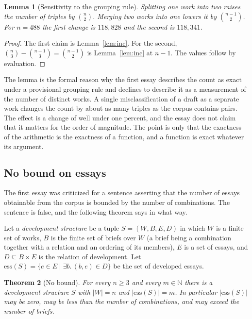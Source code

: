 \documentclass[11pt]{article}
\theoremstyle{plain}
\newtheorem{theorem}{Theorem}[section]
\newtheorem{lemma}[theorem]{Lemma}
\theoremstyle{definition}
\theoremstyle{remark}
\newcommand{\Nat}{\mathbb{N}}
\begin{document}
\begin{lemma}[Sensitivity to the grouping rule]\label{lem:group}
Splitting one work into two raises the number of triples by $\binom{n}{2}$. Merging two works into one lowers it by $\binom{n-1}{2}$. For $n=488$ the first change is $118{,}828$ and the second is $118{,}341$.
\end{lemma}

\begin{proof}
The first claim is Lemma~\ref{lem:inc}. For the second, $\binom{n}{3}-\binom{n-1}{3}=\binom{n-1}{2}$ is Lemma~\ref{lem:inc} at $n-1$. The values follow by evaluation. \qedhere
\end{proof}

The lemma is the formal reason why the first essay describes the count as exact under a provisional grouping rule and declines to describe it as a measurement of the number of distinct works. A single misclassification of a draft as a separate work changes the count by about as many triples as the corpus contains pairs. The effect is a change of well under one percent, and the essay does not claim that it matters for the order of magnitude. The point is only that the exactness of the arithmetic is the exactness of a function, and a function is exact whatever its argument.

\subsection{No bound on essays}

The first essay was criticized for a sentence asserting that the number of essays obtainable from the corpus is bounded by the number of combinations. The sentence is false, and the following theorem says in what way.

Let a \emph{development structure} be a tuple $S=(W,B,E,D)$ in which $W$ is a finite set of works, $B$ is the finite set of briefs over $W$ (a brief being a combination together with a relation and an ordering of its members), $E$ is a set of essays, and $D\subseteq B\times E$ is the relation of development. Let $\mathrm{ess}(S)=\{e\in E\mid\exists b.\,(b,e)\in D\}$ be the set of developed essays.

\begin{theorem}[No bound]\label{thm:nobound}
For every $n\ge 3$ and every $m\in\Nat$ there is a development structure $S$ with $|W|=n$ and $|\mathrm{ess}(S)|=m$. In particular $|\mathrm{ess}(S)|$ may be zero, may be less than the number of combinations, and may exceed the number of briefs.
\end{theorem}
\end{document}

